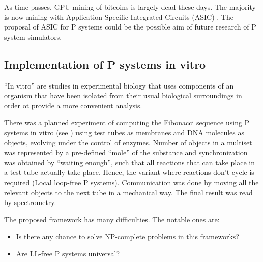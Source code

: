 As time passes, GPU mining of bitcoins is largely dead these days. The majority is now mining with Application Specific Integrated Circuits (ASIC) \cite{Smith08ASIC}. The proposal of ASIC for P systems could be the possible aim of future research of P system simulators. 


\subsection{Implementation of P systems in vitro} %
\label{sub:implementation_of_p_systems_in_vitro}

``In vitro'' are studies in experimental biology that uses components of an organism that have been isolated from their usual biological surroundings in order ot provide a more convenient analysis.

There was a planned experiment of computing the Fibonacci sequence using P systems in vitro (see \cite{Gershoni:2008:InVitro}) using test tubes as membranes and DNA molecules as objects, evolving under the control of enzymes.
Number of objects in a multiset was represented by a pre-defined ``mole'' of the substance and synchronization was obtained by ``waiting enough'', such that all reactions that can take place in a test tube actually take place. Hence, the variant where reactions don't cycle is required (Local loop-free P systems).
Communication was done by moving all the relevant objects to the next tube in a mechanical way. The final result was read by spectrometry.

The proposed framework has many difficulties. The notable ones are:

\begin{itemize}
  \item Is there any chance to solve NP-complete problems in this frameworks?
  \item Are LL-free P systems universal?
\end{itemize}


